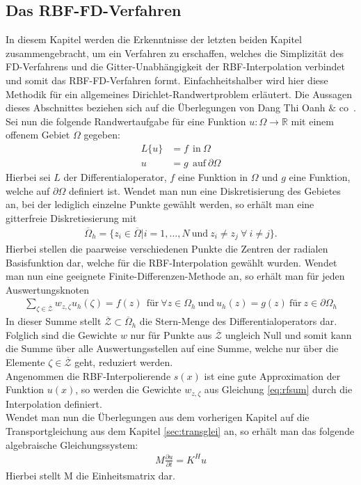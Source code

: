 \documentclass[a4paper,11pt]{article}
\begin{document}
\subsection{Das RBF-FD-Verfahren}
In diesem Kapitel werden die Erkenntnisse der letzten beiden Kapitel zusammengebracht, um ein Verfahren zu erschaffen, welches die Simplizität des FD-Verfahrens und die Gitter-Unabhängigkeit der RBF-Interpolation verbindet und somit das RBF-FD-Verfahren formt. Einfachheitshalber wird hier diese Methodik für ein allgemeines Dirichlet-Randwertproblem erläutert. Die Aussagen dieses Abschnittes beziehen sich auf die Überlegungen von Dang Thi Oanh $\&$ co~\cite{oanh2017adaptive}.\\
Sei nun die folgende Randwertaufgabe für eine Funktion $u:\Omega\rightarrow\mathbb{R}$ mit einem offenem Gebiet $\Omega$ gegeben:
\begin{align}
 L\{u\}&=f~~\text{in}~\Omega\nonumber\\
 u&=g~~\text{auf}~\partial\Omega\nonumber
\end{align}
Hierbei sei $L$ der Differentialoperator, $f$ eine Funktion in $\Omega$ und $g$ eine Funktion, welche auf $\partial\Omega$ definiert ist. Wendet man nun eine Diskretisierung des Gebietes an, bei der lediglich einzelne Punkte gewählt werden, so erhält man eine gitterfreie Diskretiesierung mit 
\begin{align}
\overline{\Omega}_h=\{z_i\in\overline{\Omega}|i=1,\dots,N~\text{und}~z_i\neq z_j~\forall~i\neq j\}.
\end{align}
Hierbei stellen die paarweise verschiedenen Punkte die Zentren der radialen Basisfunktion dar, welche für die RBF-Interpolation gewählt wurden. Wendet man nun eine geeignete Finite-Differenzen-Methode an, so erhält man für jeden Auswertungsknoten
\begin{align}
 \sum_{\zeta\in\overline{\mathcal{Z}}}w_{z,\zeta}u_h(\zeta)=f(z)~~\text{für}~\forall z\in\Omega_h~\text{und}~u_h(z)=g(z)~\text{für}~z\in\partial\Omega_h\label{eq:rfsum}
\end{align}
In dieser Summe stellt $\mathcal{\overline{Z}}\subset\overline{\Omega}_h$ die Stern-Menge des Differentialoperators dar. Folglich sind die Gewichte $w$ nur für Punkte aus $\mathcal{\overline{Z}}$ ungleich Null und somit kann die Summe über alle Auswertungsstellen auf eine Summe, welche nur über die Elemente $\zeta\in\mathcal{\overline{Z}}$ geht, reduziert werden.\\
Angenommen die RBF-Interpolierende $s(x)$ ist eine gute Approximation der Funktion $u(x)$, so werden die Gewichte $w_{z,\zeta}$ aus Gleichung \eqref{eq:rfsum} durch die Interpolation definiert.\\
Wendet man nun die Überlegungen aus dem vorherigen Kapitel auf die Transportgleichung aus dem Kapitel \ref{sec:transglei} an, so erhält man das folgende algebraische Gleichungssystem:
\begin{align}
 M\frac{\partial u}{\partial t}=K^Hu\label{eq:algTrans}
\end{align}
Hierbei stellt M die Einheitsmatrix dar.
\pagebreak
\end{document}
